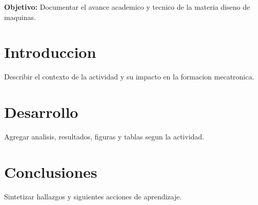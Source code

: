 \documentclass[spanish,letterpaper,oneside]{article}
\begin{document}
\templatePortrait
\templatePagecfg
\onehalfspacing

\begin{abstractd}
\textbf{Objetivo:} Documentar el avance academico y tecnico de la materia diseno de maquinas.
\end{abstractd}

\templateIndex
\templateFinalcfg

\section{Introduccion}
Describir el contexto de la actividad y su impacto en la formacion mecatronica.

\section{Desarrollo}
Agregar analisis, resultados, figuras y tablas segun la actividad.

\section{Conclusiones}
Sintetizar hallazgos y siguientes acciones de aprendizaje.



\end{document}
